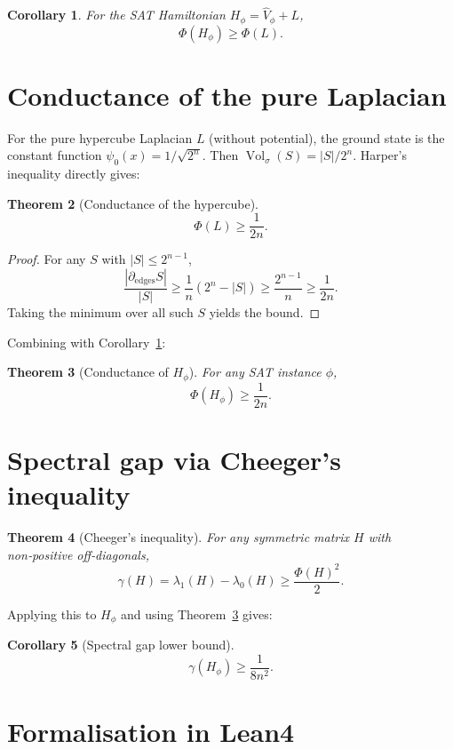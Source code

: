 \documentclass[11pt,a4paper]{article}
\newtheorem{theorem}{Theorem}[section]
\newtheorem{corollary}[theorem]{Corollary}
\begin{document}
\begin{corollary}\label{cor:bridge}
For the SAT Hamiltonian $H_\phi = \hat{V}_\phi + L$,
\[
\Phi(H_\phi) \ge \Phi(L).
\]
\end{corollary}

\section{Conductance of the pure Laplacian}

For the pure hypercube Laplacian $L$ (without potential), the ground state is the constant function $\psi_0(x)=1/\sqrt{2^n}$. Then $\operatorname{Vol}_\sigma(S)=|S|/2^n$. Harper's inequality directly gives:

\begin{theorem}[Conductance of the hypercube]\label{thm:conductance}
\[
\Phi(L) \ge \frac{1}{2n}.
\]
\end{theorem}
\begin{proof}
For any $S$ with $|S|\le 2^{n-1}$,
\[
\frac{|\partial_{\mathrm{edges}} S|}{|S|} \ge \frac{1}{n}(2^n-|S|) \ge \frac{2^{n-1}}{n} \ge \frac{1}{2n}.
\]
Taking the minimum over all such $S$ yields the bound.
\end{proof}

Combining with Corollary~\ref{cor:bridge}:

\begin{theorem}[Conductance of $H_\phi$]\label{thm:phi}
For any SAT instance $\phi$,
\[
\Phi(H_\phi) \ge \frac{1}{2n}.
\]
\end{theorem}

\section{Spectral gap via Cheeger's inequality}

\begin{theorem}[Cheeger's inequality]\label{thm:cheeger}
For any symmetric matrix $H$ with non‑positive off‑diagonals,
\[
\gamma(H) = \lambda_1(H) - \lambda_0(H) \ge \frac{\Phi(H)^2}{2}.
\]
\end{theorem}

Applying this to $H_\phi$ and using Theorem~\ref{thm:phi} gives:

\begin{corollary}[Spectral gap lower bound]\label{cor:gap}
\[
\gamma(H_\phi) \ge \frac{1}{8n^2}.
\]
\end{corollary}

\section{Formalisation in Lean4}
\end{document}

